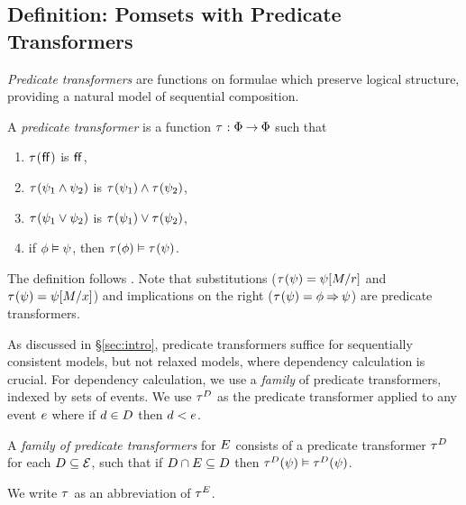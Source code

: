 \subsection{Definition: Pomsets with Predicate Transformers}
\label{sec:pomsets}

\emph{Predicate transformers} are functions on formulae which preserve
logical structure, providing a natural model of sequential composition.


\begin{definition}
  \label{def:trans}
  A \emph{predicate transformer} is a %
  function
  $\aTr{}{}:\Formulae\fun\Formulae$ such that
  \begin{multicols}{2}
    \begin{enumerate}[,label=(\textsc{x}\arabic*),ref=\textsc{x}\arabic*]
    \item \label{tr-false}
      $\aTr{}{\FALSE}$ is $\mkern.6mu\mathsf{ff}\mkern.6mu$,    
    \item \label{tr-and}
      $\aTr{}{\bForm_1\land\bForm_2}$ is $\aTr{}{\bForm_1}\land\aTr{}{\bForm_2}$,    
    \item \label{tr-or}
      $\aTr{}{\bForm_1\lor\bForm_2}$ is $\aTr{}{\bForm_1}\lor\aTr{}{\bForm_2}$, 
    \item \label{tr-implies}
      if $\phi \mathrel{\vDash} \psi$, then $\aTr{}{\aForm} \rimplies
      \aTr{}{\bForm}$.
    \end{enumerate}
  \end{multicols}
\end{definition}
\noindent
The definition follows \citet{DBLP:journals/cacm/Dijkstra75}.  Note that
substitutions ($\aTr{}{\psi}=\psi[\aExp/\aReg]$ and
$\aTr{}{\psi}=\psi[\aExp/\aLoc]$) and implications on the right
($\aTr{}{\psi}=\phi\limplies\psi$) are predicate transformers.

As discussed in \S\ref{sec:intro}, predicate transformers suffice for sequentially consistent
models, but not relaxed models, where dependency calculation is crucial.
For dependency calculation, we use a \emph{family} of predicate transformers,
indexed by sets of events. We use $\aTr{\bEvs}{}$ as the predicate transformer
applied to any event $e$ where if $d\in D$ then $d<e$.

\begin{definition}
  \label{def:family}
  A \emph{family of predicate transformers} for $E$ consists of a
  predicate transformer $\aTr{\bEvs}{}$ for each $D\subseteq\mathcal{E}$,
  such that if $D \cap E \subseteq D$ then $\aTr{\cEvs}{\bForm}
  \rimplies \aTr{\bEvs}{\bForm}$.

  We write $\aTr{}{}$ as an abbreviation of $\aTr{\aEvs}{}$.
\end{definition}

